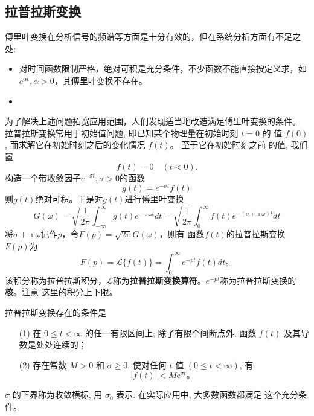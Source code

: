 \subsection{拉普拉斯变换}
\label{subsec:laplace_transform}

傅里叶变换在分析信号的频谱等方面是十分有效的，但在系统分析方面有不足之处:

\begin{itemize}
    \item 对时间函数限制严格，绝对可积是充分条件，不少函数不能直接按定义求，如$e^{\alpha t}, \alpha > 0$，其傅里叶变换不存在。

    \item  
\end{itemize}
为了解决上述问题拓宽应用范围，人们发现适当地改造满足傅里叶变换的条件。
拉普拉斯变换常用于初始值问题, 即已知某个物理量在初始时刻 $t=0$ 的 值 $f(0)$, 而求解它在初始时刻之后的变化情况 $f(t)$。
 至于它在初始时刻之前 的值, 我们置
$$
f(t)=0 \quad(t<0) .
$$
构造一个带收敛因子$e^{-\sigma t}, \sigma > 0$的函数
$$
g(t) =e^{-\sigma t} f(t)
$$
则$g(t)$绝对可积。于是对$g(t)$进行傅里叶变换:
\begin{equation}
    G(\omega) = \sqrt{\frac{1}{2\pi} } \int_{-\infty}^{\infty} g(t) e^{-\imath \omega t} dt 
    = \sqrt{\frac{1}{2\pi} } \int_{0}^{\infty} f(t) e^{-(\sigma + \imath \omega) t} dt  
\end{equation}
将$\sigma + \imath \omega$记作$p$，令$F(p)=\sqrt{2\pi}G(\omega)$，则有
函数$f(t)$的拉普拉斯变换$F(p)$为
\begin{equation}
    F(p) = \mathcal{L} \{ f(t) \} = \int_0 ^{\infty} e^{-pt} f(t) dt \textrm{。}
\end{equation}
该积分称为拉普拉斯积分，$\mathcal{L}$称为\textbf{拉普拉斯变换算符}。$e^{-pt}$称为拉普拉斯变换的\textbf{核}。注意
这里的积分上下限。

拉普拉斯变换存在的条件是 
\begin{enumerate}
    \item[(1)]  在 $0 \leqslant t<\infty$ 的任一有限区间上; 除了有限个间断点外, 函数 $f(t)$ 及其导数是处处连续的；
    \item[(2)]  存在常数 $M>0$ 和 $\sigma \geqslant 0$, 使对任何 $t$ 值 $(0 \leqslant t<\infty)$, 有
    $$
    |f(t)|<M \mathrm{e}^{\sigma t} \text {。 }
    $$
\end{enumerate}
$\sigma$ 的下界称为收敛横标, 用 $\sigma_0$ 表示. 在实际应用中, 大多数函数都满足 这个充分条件。

